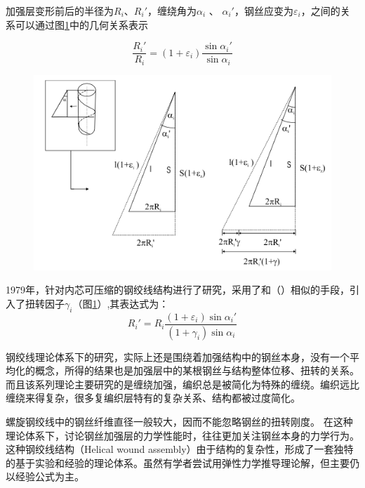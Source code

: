 加强层变形前后的半径为$ R_i $、$ R_i' $，缠绕角为$ \alpha_i$ 、 $\alpha_i' $，钢丝应变为$ \varepsilon_i $，之间的关系可以通过图\ref{fig:assumption-deformed-geometry}中的几何关系表示

\begin{equation}
\frac{{{R_i}'}}{{{R_i}}} = \left( {1 + {\varepsilon _i}} \right)\frac{{\sin {\alpha _i}'}}{{\sin {\alpha _i}}}
\end{equation}

\begin{figure}[!htbp]
	\centering
	\includegraphics[width=0.7\linewidth]{figure/chap3/review/a}
	\label{fig:assumption-deformed-geometry}
\end{figure}

1979年，\citeauthor{Knapp1979}\cite{Knapp1979}针对内芯可压缩的钢绞线结构进行了研究，采用了和\citeauthor{machida1973}（\citeyear{machida1973}）相似的手段，引入了扭转因子$ \gamma_i $（图\ref{fig:assumption-deformed-geometry}）,其表达式为：
\begin{equation}
{R_i}' = {R_i}\frac{{\left( {1 + {\varepsilon _i}} \right)\sin {\alpha _i}'}}{{\left( {1 + {\gamma _i}} \right)\sin {\alpha _i}}}
\end{equation}

钢绞线理论体系下的研究，实际上还是围绕着加强结构中的钢丝本身，没有一个平均化的概念，所得的结果也是加强层中的某根钢丝与结构整体位移、扭转的关系。而且该系列理论主要研究的是缠绕加强，编织总是被简化为特殊的缠绕。编织远比缠绕来得复杂，很多复编织层特有的复杂关系、结构都被过度简化\cite{Breig1988}。

螺旋钢绞线中的钢丝纤维直径一般较大，因而不能忽略钢丝的扭转刚度。
在这种理论体系下，讨论钢丝加强层的力学性能时，往往更加关注钢丝本身的力学行为。这种钢绞线结构（Helical wound assembly）由于结构的复杂性，形成了一套独特的基于实验和经验的理论体系\cite{Cardou1997}。虽然有学者尝试用弹性力学推导理论解\cite{phillips1972,machida1973}，但主要仍以经验公式为主。

